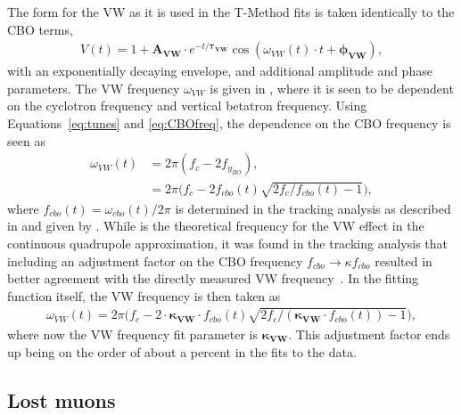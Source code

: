 The form for the VW as it is used in the T-Method fits is taken identically to the CBO terms, 
    \begin{align} \label{eq:VWterm}
        V(t) = 1 + \boldsymbol{A_{VW}} \cdot e^{-t/\boldsymbol{\tau_{VW}}} \cos(\omega_{VW}(t) \cdot t + \boldsymbol{\phi_{VW}}), 
    \end{align}
with an exponentially decaying envelope, and additional amplitude and phase parameters. The VW frequency $\omega_{VW}$ is given in , where it is seen to be dependent on the cyclotron frequency and vertical betatron frequency. Using Equations~\ref{eq:tunes} and \ref{eq:CBOfreq}, the dependence on the CBO frequency is seen as
    \begin{equation}
    \begin{aligned}
        \omega_{VW}(t) &= 2\pi (f_{c} - 2f_{y_{BO}}), \\
                    &= 2\pi \Big(f_{c} - 2f_{cbo}(t)\sqrt{2f_{c}/f_{cbo}(t)-1}\Big),
    \label{eq:VWfreqOne}
    \end{aligned}
    \end{equation}
where $f_{cbo}(t) = \omega_{cbo}(t)/2\pi$ is determined in the tracking analysis as described in  and given by . While  is the theoretical frequency for the VW effect in the continuous quadrupole approximation, it was found in the tracking analysis that including an adjustment factor on the CBO frequency $f_{cbo} \rightarrow \kappa f_{cbo}$ resulted in better agreement with the directly measured VW frequency~\cite{cbofrequency,verticalbetatron}. In the fitting function itself, the VW frequency is then taken as
    \begin{align} \label{eq:VWfreqKappa}
        \omega_{VW}(t) = 2\pi \Big(f_{c} - 2 \cdot \boldsymbol{\kappa_{VW}} \cdot f_{cbo}(t)\sqrt{2f_{c}/(\boldsymbol{\kappa_{VW}} \cdot f_{cbo}(t))-1}\Big),
    \end{align}
where now the VW frequency fit parameter is $\boldsymbol{\kappa_{VW}}$. This adjustment factor ends up being on the order of about a percent in the fits to the data.




\subsection{Lost muons}
\label{subsec:lostmuons}


